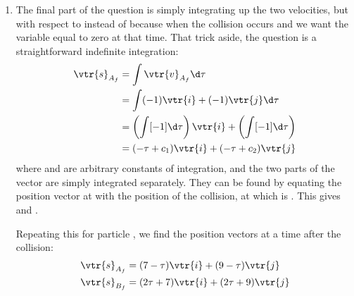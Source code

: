 \begin{problem}[A1988FMIVQ1a]
{\begin{enumerate}
Solving  Equations \eqref{CoM_vtr_i}, \eqref{CoM_vtr_j}, \eqref{CoE_vtr} and \eqref{1D_vtr_x} for the 4 unknowns produces two solutions: the initial conditions,  $=$  and  $=$  which correspond to  and  but also the final velocities we are looking for. Writing them in vector form:
\begin{align*} 
\vtr{v}_{A_{f}} &= - \vtr{i}  - \vtr{j} \\ 
\vtr{v}_{B_{f}} &= 2\vtr{i} + 2\vtr{j} 
\end{align*}
which is simply a swapping over of velocities, as expected in an elastic collision with identical particles.
	\item The final part of the question is simply integrating up the two velocities, but with respect to \vari{\tau} instead of  because  when the collision occurs and we want the variable equal to zero at that time. That trick aside, the question is a straightforward indefinite integration:
\begin{align*}
 \vtr{s}_{A_{f}} &= \int \vtr{v}_{A_{f}} \d \tau \\ 
 &= \int (-1)\vtr{i} + (-1)\vtr{j} \d \tau \\
  &= \left( \int [-1] \d \tau \right)\vtr{i} + \left( \int [-1] \d \tau \right) \\ 
  &= (-\tau + c_{1})\vtr{i} + (-\tau + c_{2})\vtr{j} 
  \end{align*} 
 where  and  are arbitrary constants of integration, and the two parts of the vector are simply integrated separately. They can be found by equating the position vector  at  with the position of the collision,  at  which is . This gives  and .

Repeating this for particle , we find the position vectors at a time \vari{\tau} after the collision:
\begin{align*}
 \vtr{s}_{A_{f}} &= (7 - \tau)\vtr{i} + (9 - \tau)\vtr{j} \\ 
 \vtr{s}_{B_{f}} &= (2\tau + 7)\vtr{i} + (2\tau + 9)\vtr{j} 
 \end{align*}
\end{enumerate}
}
\end{problem}